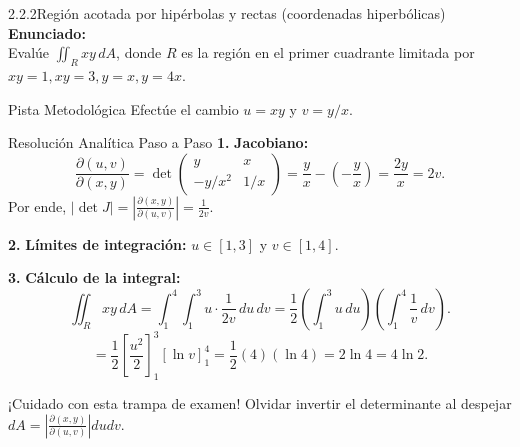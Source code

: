 \documentclass[11pt,a4paper]{article}
\begin{document}
\begin{nivelbox}{2.2.2}{Región acotada por hipérbolas y rectas (coordenadas hiperbólicas)}
\textbf{Enunciado:}\\
Evalúe $\iint_R xy \, dA$, donde $R$ es la región en el primer cuadrante limitada por $xy = 1, xy = 3, y = x, y = 4x$.

\begin{observacionbox}{Pista Metodológica}
Efectúe el cambio $u = xy$ y $v = y/x$.
\end{observacionbox}

\begin{ejerciciobox}{Resolución Analítica Paso a Paso}
\smallskip\noindent\textbf{1.} \textbf{Jacobiano:}
\[\frac{\partial(u,v)}{\partial(x,y)} = \det \begin{pmatrix} y & x \\ -y/x^2 & 1/x \end{pmatrix} = \frac{y}{x} - \left(-\frac{y}{x}\right) = \frac{2y}{x} = 2v.\]
Por ende, $|\det J| = \left| \frac{\partial(x,y)}{\partial(u,v)} \right| = \frac{1}{2v}$.

\smallskip\noindent\textbf{2.} \textbf{Límites de integración:}
$u \in [1, 3]$ y $v \in [1, 4]$.

\smallskip\noindent\textbf{3.} \textbf{Cálculo de la integral:}
\[\iint_R xy \, dA = \int_1^4 \int_1^3 u \cdot \frac{1}{2v} \, du \, dv = \frac{1}{2} \left( \int_1^3 u \, du \right) \left( \int_1^4 \frac{1}{v} \, dv \right).\]
\[= \frac{1}{2} \left[ \frac{u^2}{2} \right]_1^3 [\ln v]_1^4 = \frac{1}{2} (4) (\ln 4) = 2 \ln 4 = 4 \ln 2.\]
\end{ejerciciobox}

\begin{errorbox}{¡Cuidado con esta trampa de examen!}
Olvidar invertir el determinante al despejar $dA = \left|\frac{\partial(x,y)}{\partial(u,v)}\right| du dv$.
\end{errorbox}
\end{nivelbox}
\bigskip
\end{document}
